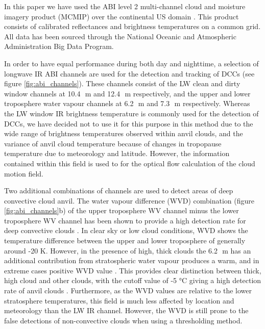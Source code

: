 In this paper we have used the ABI level 2 multi-channel cloud and moisture imagery product (MCMIP) over the continental US domain \citep{schmit_chapter_2020}.
This product consists of calibrated reflectances and brightness temperatures on a common grid.
All data has been sourced through the National Oceanic and Atmospheric Administration Big Data Program.

In order to have equal performance during both day and nighttime, a selection of longwave IR ABI channels are used for the detection and tracking of DCCs (see figure \ref{fig:abi_channels}). 
These channels consist of the LW clean and dirty window channels at 10.4\,\unit{\mu m} and 12.4\,\unit{\mu m} respectively, and the upper and lower troposphere water vapour channels at 6.2\,\unit{\mu m} and 7.3\,\unit{\mu m} respectively.
Whereas the LW window IR brightness temperature is commonly used for the detection of DCCs, we have decided not to use it for this purpose in this method due to the wide range of brightness temperatures observed within anvil clouds, and the variance of anvil cloud temperature because of changes in tropopause temperature due to meteorology and latitude.
However, the information contained within this field is used to for the optical flow calculation of the cloud motion field.

Two additional combinations of channels are used to detect areas of deep convective cloud anvil. 
The water vapour difference (WVD) combination (figure \ref{fig:abi_channels}b) of the upper troposphere WV channel minus the lower troposphere WV channel has been shown to provide a high detection rate for deep convective clouds \citep{muller_role_2018, muller_novel_2019}.
In clear sky or low cloud conditions, WVD shows the temperature difference between the upper and lower troposphere of generally around -20 K. 
However, in the presence of high, thick clouds the 6.2\,\unit{\mu m} has an additional contribution from stratospheric water vapour produces a warm, and in extreme cases positive WVD value \citep{schmetz_monitoring_1997}.
This provides clear distinction between thick, high cloud and other clouds, with the cutoff value of -5 °C giving a high detection rate of anvil clouds \citep{muller_novel_2019}. 
Furthermore, as the WVD values are relative to the lower stratosphere temperatures, this field is much less affected by location and meteorology than the LW IR channel.
However, the WVD is still prone to the false detections of non-convective clouds when using a thresholding method.

